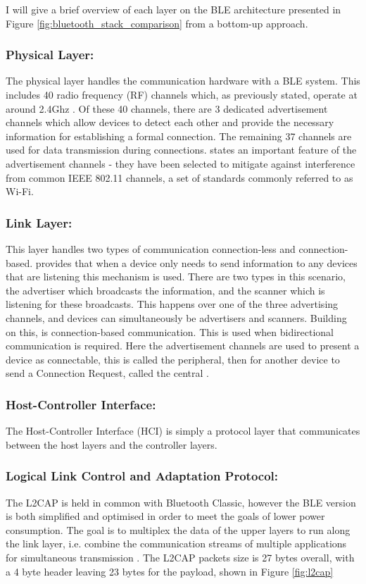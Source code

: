 \documentclass{l4proj}
\begin{document}
I will give a brief overview of each layer on the BLE architecture presented in Figure \ref{fig:bluetooth_stack_comparison} from a bottom-up approach.

\subsubsection{Physical Layer:} The physical layer handles the communication hardware with a BLE system. This includes 40 radio frequency (RF) channels which, as previously stated, operate at around 2.4Ghz \citep{yang_beyond_2020}. Of these 40 channels, there are 3 dedicated advertisement channels which allow devices to detect each other and provide the necessary information for establishing a formal connection. The remaining 37 channels are used for data transmission during connections. \citet{gomez_overview_2012} states an important feature of the advertisement channels - they have been selected to mitigate against interference from common IEEE 802.11 channels, a set of standards commonly referred to as Wi-Fi.

\subsubsection{Link Layer:} This layer handles two types of communication connection-less and connection-based. \citet{yang_beyond_2020} provides that when a device only needs to send information to any devices that are listening this mechanism is used. There are two types in this scenario, the advertiser which broadcasts the information, and the scanner which is listening for these broadcasts. This happens over one of the three advertising channels, and devices can simultaneously be advertisers and scanners. Building on this, is connection-based communication. This is used when bidirectional communication is required. Here the advertisement channels are used to present a device as connectable, this is called the peripheral, then for another device to send a Connection Request, called the central \citep{gomez_overview_2012}.

\subsubsection{Host-Controller Interface:} The Host-Controller Interface (HCI) is simply a protocol layer that communicates between the host layers and the controller layers.

\subsubsection{Logical Link Control and Adaptation Protocol:} The L2CAP is held in common with Bluetooth Classic, however the BLE version is both simplified and optimised in order to meet the goals of lower power consumption. The goal is to multiplex the data of the upper layers to run along the link layer, i.e. combine the communication streams of multiple applications for simultaneous transmission \citep{gomez_overview_2012}. The L2CAP packets size is 27 bytes overall, with a 4 byte header leaving 23 bytes for the payload, shown in Figure \ref{fig:l2cap}
\end{document}
